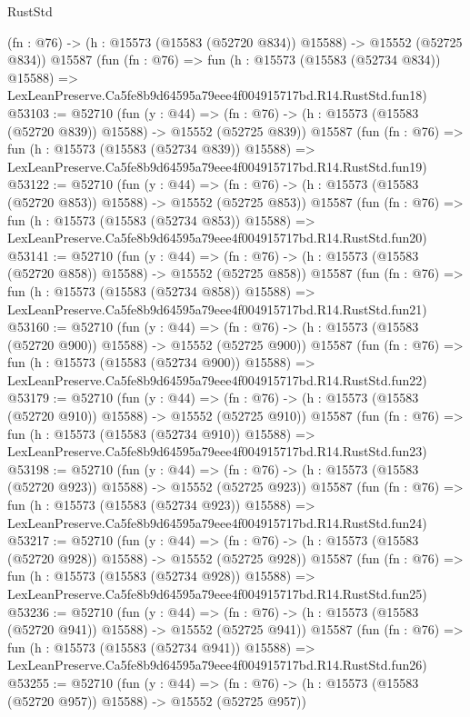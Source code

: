 \begin{lexlean}{RustStd}
\begin{coremodule}
    (fn : @76) -> (h : @15573 (@15583 (@52720 @834)) @15588) -> @15552 (@52725 @834))
    @15587
    (fun (fn : @76) =>
    fun (h : @15573 (@15583 (@52734 @834)) @15588) =>
    LexLeanPreserve.Ca5fe8b9d64595a79eee4f004915717bd.R14.RustStd.fun18)
@53103 := @52710
    (fun (y : @44) =>
    (fn : @76) -> (h : @15573 (@15583 (@52720 @839)) @15588) -> @15552 (@52725 @839))
    @15587
    (fun (fn : @76) =>
    fun (h : @15573 (@15583 (@52734 @839)) @15588) =>
    LexLeanPreserve.Ca5fe8b9d64595a79eee4f004915717bd.R14.RustStd.fun19)
@53122 := @52710
    (fun (y : @44) =>
    (fn : @76) -> (h : @15573 (@15583 (@52720 @853)) @15588) -> @15552 (@52725 @853))
    @15587
    (fun (fn : @76) =>
    fun (h : @15573 (@15583 (@52734 @853)) @15588) =>
    LexLeanPreserve.Ca5fe8b9d64595a79eee4f004915717bd.R14.RustStd.fun20)
@53141 := @52710
    (fun (y : @44) =>
    (fn : @76) -> (h : @15573 (@15583 (@52720 @858)) @15588) -> @15552 (@52725 @858))
    @15587
    (fun (fn : @76) =>
    fun (h : @15573 (@15583 (@52734 @858)) @15588) =>
    LexLeanPreserve.Ca5fe8b9d64595a79eee4f004915717bd.R14.RustStd.fun21)
@53160 := @52710
    (fun (y : @44) =>
    (fn : @76) -> (h : @15573 (@15583 (@52720 @900)) @15588) -> @15552 (@52725 @900))
    @15587
    (fun (fn : @76) =>
    fun (h : @15573 (@15583 (@52734 @900)) @15588) =>
    LexLeanPreserve.Ca5fe8b9d64595a79eee4f004915717bd.R14.RustStd.fun22)
@53179 := @52710
    (fun (y : @44) =>
    (fn : @76) -> (h : @15573 (@15583 (@52720 @910)) @15588) -> @15552 (@52725 @910))
    @15587
    (fun (fn : @76) =>
    fun (h : @15573 (@15583 (@52734 @910)) @15588) =>
    LexLeanPreserve.Ca5fe8b9d64595a79eee4f004915717bd.R14.RustStd.fun23)
@53198 := @52710
    (fun (y : @44) =>
    (fn : @76) -> (h : @15573 (@15583 (@52720 @923)) @15588) -> @15552 (@52725 @923))
    @15587
    (fun (fn : @76) =>
    fun (h : @15573 (@15583 (@52734 @923)) @15588) =>
    LexLeanPreserve.Ca5fe8b9d64595a79eee4f004915717bd.R14.RustStd.fun24)
@53217 := @52710
    (fun (y : @44) =>
    (fn : @76) -> (h : @15573 (@15583 (@52720 @928)) @15588) -> @15552 (@52725 @928))
    @15587
    (fun (fn : @76) =>
    fun (h : @15573 (@15583 (@52734 @928)) @15588) =>
    LexLeanPreserve.Ca5fe8b9d64595a79eee4f004915717bd.R14.RustStd.fun25)
@53236 := @52710
    (fun (y : @44) =>
    (fn : @76) -> (h : @15573 (@15583 (@52720 @941)) @15588) -> @15552 (@52725 @941))
    @15587
    (fun (fn : @76) =>
    fun (h : @15573 (@15583 (@52734 @941)) @15588) =>
    LexLeanPreserve.Ca5fe8b9d64595a79eee4f004915717bd.R14.RustStd.fun26)
@53255 := @52710
    (fun (y : @44) =>
    (fn : @76) -> (h : @15573 (@15583 (@52720 @957)) @15588) -> @15552 (@52725 @957))

\end{coremodule}
\end{lexlean}
